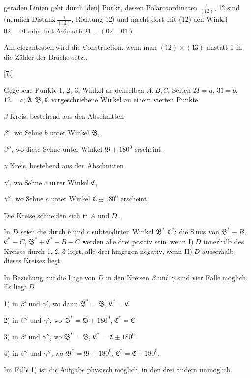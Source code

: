 geraden Linien geht durch [den] Punkt, dessen Polarcoordinaten $\frac{1}{(12)}$, 12 sind (nemlich Distanz $\frac{1}{(12)}$, Richtung 12) und macht dort mit (12) den Winkel $02-01$ oder hat Azimuth $21-(02-01)$.

Am elegantesten wird die Construction, wenn man $(12)\times(13)$ anstatt 1 in die Zähler der Brüche setzt.

\medskip

\begin{center}[7.]\end{center}

Gegebene Punkte 1, 2, 3; Winkel an denselben $A, B, C$; Seiten $23=a$, $31=b$, $12=c$; $\mathfrak{A}, \mathfrak{B}, \mathfrak{C}$ vorgeschriebene Winkel an einem vierten Punkte.

$\beta$ Kreis, bestehend aus den Abschnitten

$\beta'$, wo Sehne $b$ unter Winkel $\mathfrak{B}$,

$\beta''$, wo diese Sehne unter Winkel $\mathfrak{B}\pm180^0$ erscheint.

$\gamma$ Kreis, bestehend aus den Abschnitten

$\gamma'$, wo Sehne $c$ unter Winkel $\mathfrak{C}$,

$\gamma''$, wo Sehne $c$ unter Winkel $\mathfrak{C}\pm180^0$ erscheint.

Die Kreise schneiden sich in $A$ und $D$.

In $D$ seien die durch $b$ und $c$ subtendirten Winkel $\mathfrak{B}^*, \mathfrak{C}^*$; die Sinus von $\mathfrak{B}^*-B$, $\mathfrak{C}^*-C$, $\mathfrak{B}^*+\mathfrak{C}^*-B-C$ werden alle drei positiv sein, wenn I) $D$ innerhalb des Kreises durch 1, 2, 3 liegt, alle drei hingegen negativ, wenn II) $D$ ausserhalb dieses Kreises liegt.

In Beziehung auf die Lage von $D$ in den Kreisen $\beta$ und $\gamma$ sind vier Fälle möglich. Es liegt $D$

1) in $\beta'$ und $\gamma'$, wo dann $\mathfrak{B}^*=\mathfrak{B}$, $\mathfrak{C}^*=\mathfrak{C}$

2) in $\beta''$ und $\gamma'$, wo $\mathfrak{B}^*=\mathfrak{B}\pm180^0$, $\mathfrak{C}^*=\mathfrak{C}$

3) in $\beta'$ und $\gamma''$, wo $\mathfrak{B}^*=\mathfrak{B}$, $\mathfrak{C}^*=\mathfrak{C}\pm180^0$

4) in $\beta''$ und $\gamma''$, wo $\mathfrak{B}^*=\mathfrak{B}\pm180^0$, $\mathfrak{C}^*=\mathfrak{C}\pm180^0$.

Im Falle 1) ist die Aufgabe physisch möglich, in den drei andern unmöglich.
